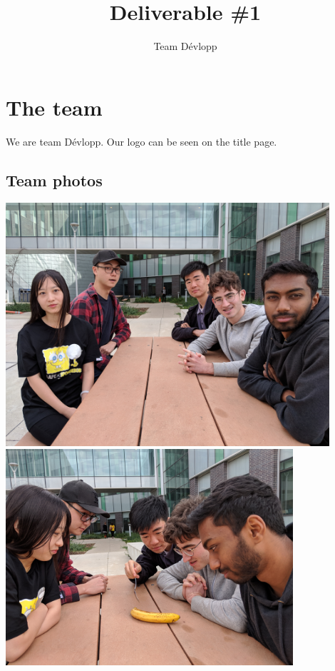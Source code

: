 \documentclass[12pt]{scrreprt}
\title{Deliverable \#1}
\author{Team D\'evlopp}
\begin{document}
\maketitle
\tableofcontents

\section{The team}
We are team D\'evlopp. Our logo can be seen on the title page.

\subsection{Team photos}
\begin{center}
	\includegraphics[width=0.9\textwidth]{team.jpg}
	\includegraphics[width=0.8\textwidth]{food1.jpg}
	\vspace{0.5cm}

\end{center}
\end{document}
